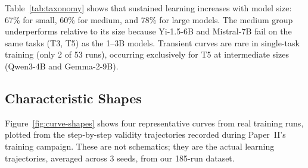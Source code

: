 \documentclass[11pt]{article}
\begin{document}
Table~\ref{tab:taxonomy} shows that sustained learning increases with model size: 67\% for small, 60\% for medium, and 78\% for large models.  The medium group underperforms relative to its size because Yi-1.5-6B and Mistral-7B fail on the same tasks (T3, T5) as the 1--3B models.  Transient curves are rare in single-task training (only 2 of 53 runs), occurring exclusively for T5 at intermediate sizes (Qwen3-4B and Gemma-2-9B).

\subsection{Characteristic Shapes}

Figure~\ref{fig:curve-shapes} shows four representative curves from real training runs, plotted from the step-by-step validity trajectories recorded during Paper~II's training campaign.  These are not schematics; they are the actual learning trajectories, averaged across 3 seeds, from our 185-run dataset.
\end{document}
